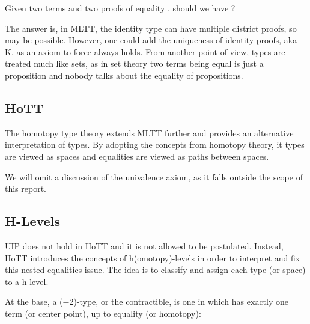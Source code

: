 Given two terms  \AgdaSymbol{:}  and two proofs of equality  \AgdaSymbol{:}   , should we have   ?

The answer is, in MLTT, the identity type can have multiple district proofs, so    may be possible. However, one could add the uniqueness of identity proofs, aka K, as an axiom to force    always holds. From another point of view, types are treated much like sets, as in set theory two terms being equal is just a proposition and nobody talks about the equality of propositions.

\subsection*{HoTT}

The homotopy type theory extends MLTT further and provides an alternative interpretation of types. By adopting the concepts from homotopy theory, it types are viewed as spaces and equalities are viewed as paths between spaces.

We will omit a discussion of the univalence axiom, as it falls outside the scope of this report.

\subsection*{H-Levels}

UIP does not hold in HoTT and it is not allowed to be postulated. Instead, HoTT introduces the concepts of h(omotopy)-levels in order to interpret and fix this nested equalities issue. The idea is to classify and assign each type (or space) to a h-level.

At the base, a (−2)-type, or the contractible, is one in which has exactly one term (or center point), up to equality (or homotopy):

\begin{code}%
\>[0]\AgdaSpace{}%
\AgdaSpace{}%
\AgdaSymbol{(}\AgdaSpace{}%
\AgdaSymbol{:}\AgdaSpace{}%
\AgdaSymbol{)}\AgdaSpace{}%
\AgdaSymbol{:}\AgdaSpace{}%
\AgdaSpace{}%
\<%
\\
\>[0][@{}l@{\AgdaIndent{0}}]%
\>[2]\<%
\\
\>[2][@{}l@{\AgdaIndent{0}}]%
\>[4]\AgdaSpace{}%
\AgdaSymbol{:}\AgdaSpace{}%
\<%
\\
%
\>[4]\AgdaSpace{}%
\AgdaSymbol{:}\AgdaSpace{}%
\AgdaSymbol{(}\AgdaSpace{}%
\AgdaSymbol{:}\AgdaSpace{}%
\AgdaSymbol{)}\AgdaSpace{}%
\AgdaSpace{}%
\AgdaSpace{}%
\AgdaSpace{}%
\<%
\end{code}

